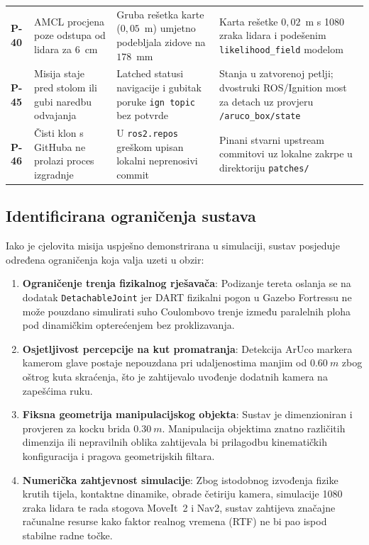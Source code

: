 \begin{table}[H]
\begin{tabularx}{\textwidth}{@{}>{\bfseries}p{1.4cm}>{\raggedright\arraybackslash}p{3.2cm}>{\raggedright\arraybackslash}X>{\raggedright\arraybackslash}X@{}}
    P-40 & AMCL procjena poze odstupa od lidara za 6~cm & Gruba rešetka karte ($0{,}05$~m) umjetno podebljala zidove na $178$~mm & Karta rešetke $0{,}02$~m s 1080 zraka lidara i podešenim \texttt{likelihood\_field} modelom \\
    P-45 & Misija staje pred stolom ili gubi naredbu odvajanja & Latched statusi navigacije i gubitak poruke \texttt{ign topic} bez potvrde & Stanja u zatvorenoj petlji; dvostruki ROS/Ignition most za detach uz provjeru \texttt{/aruco\_box/state} \\
    P-46 & Čisti klon s GitHuba ne prolazi proces izgradnje & U \texttt{ros2.repos} greškom upisan lokalni neprenosivi commit & Pinani stvarni upstream commitovi uz lokalne zakrpe u direktoriju \texttt{patches/} \\
    \bottomrule
  \end{tabularx}
\end{table}

\subsection{Identificirana ograničenja sustava}
\label{sec:09-ogranicenja}

Iako je cjelovita misija uspješno demonstrirana u simulaciji, sustav posjeduje određena
ograničenja koja valja uzeti u obzir:
\begin{enumerate}
  \item \textbf{Ograničenje trenja fizikalnog rješavača}: Podizanje tereta oslanja se na dodatak
    \texttt{DetachableJoint} jer DART fizikalni pogon u Gazebo Fortressu ne može pouzdano simulirati
    suho Coulombovo trenje između paralelnih ploha pod dinamičkim opterećenjem bez proklizavanja.
  \item \textbf{Osjetljivost percepcije na kut promatranja}: Detekcija ArUco markera kamerom glave
    postaje nepouzdana pri udaljenostima manjim od $\SI{0.60}{m}$ zbog oštrog kuta skraćenja, što je
    zahtijevalo uvođenje dodatnih kamera na zapešćima ruku.
  \item \textbf{Fiksna geometrija manipulacijskog objekta}: Sustav je dimenzioniran i provjeren za
    kocku brida $\SI{0.30}{m}$. Manipulacija objektima znatno različitih dimenzija ili nepravilnih
    oblika zahtijevala bi prilagodbu kinematičkih konfiguracija i pragova geometrijskih filtara.
  \item \textbf{Numerička zahtjevnost simulacije}: Zbog istodobnog izvođenja fizike krutih tijela,
    kontaktne dinamike, obrade četiriju kamera, simulacije 1080 zraka lidara te rada stogova MoveIt~2
    i Nav2, sustav zahtijeva značajne računalne resurse kako faktor realnog vremena (RTF) ne bi pao
    ispod stabilne radne točke.
\end{enumerate}
